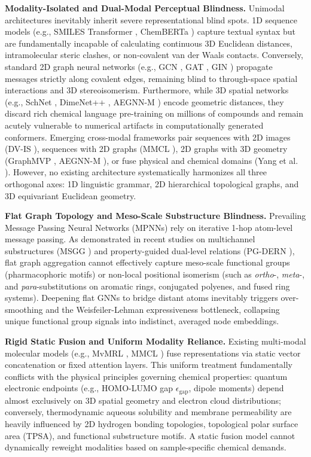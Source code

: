 \documentclass[10pt,twocolumn]{article}
\begin{document}
\noindent\textbf{Modality-Isolated and Dual-Modal Perceptual Blindness.} Unimodal architectures inevitably inherit severe representational blind spots. 1D sequence models (e.g., SMILES Transformer \cite{honda2019smiles}, ChemBERTa \cite{chithrananda2020chemberta}) capture textual syntax but are fundamentally incapable of calculating continuous 3D Euclidean distances, intramolecular steric clashes, or non-covalent van der Waals contacts. Conversely, standard 2D graph neural networks (e.g., GCN \cite{kipf2017semi}, GAT \cite{velickovic2018graph}, GIN \cite{xu2019powerful}) propagate messages strictly along covalent edges, remaining blind to through-space spatial interactions and 3D stereoisomerism. Furthermore, while 3D spatial networks (e.g., SchNet \cite{schutt2018schnet}, DimeNet++ \cite{gasteiger2020directional}, AEGNN-M \cite{cai2025aegnn}) encode geometric distances, they discard rich chemical language pre-training on millions of compounds and remain acutely vulnerable to numerical artifacts in computationally generated conformers. Emerging cross-modal frameworks pair sequences with 2D images (DV-IS \cite{zhang2024dual}), sequences with 2D graphs (MMCL \cite{gao2026mmcl}), 2D graphs with 3D geometry (GraphMVP \cite{liu2022pretraining}, AEGNN-M \cite{cai2025aegnn}), or fuse physical and chemical domains (Yang et al. \cite{yang2021deep}). However, no existing architecture systematically harmonizes all three orthogonal axes: 1D linguistic grammar, 2D hierarchical topological graphs, and 3D equivariant Euclidean geometry.

\noindent\textbf{Flat Graph Topology and Meso-Scale Substructure Blindness.} Prevailing Message Passing Neural Networks (MPNNs) rely on iterative 1-hop atom-level message passing. As demonstrated in recent studies on multichannel substructures (MSGG \cite{wang2020molecular}) and property-guided dual-level relations (PG-DERN \cite{zhang2025property}), flat graph aggregation cannot effectively capture meso-scale functional groups (pharmacophoric motifs) or non-local positional isomerism (such as \textit{ortho}-, \textit{meta}-, and \textit{para}-substitutions on aromatic rings, conjugated polyenes, and fused ring systems). Deepening flat GNNs to bridge distant atoms inevitably triggers over-smoothing and the Weisfeiler-Lehman expressiveness bottleneck, collapsing unique functional group signals into indistinct, averaged node embeddings.

\noindent\textbf{Rigid Static Fusion and Uniform Modality Reliance.} Existing multi-modal molecular models (e.g., MvMRL \cite{zhang2024mvmrl}, MMCL \cite{gao2026mmcl}) fuse representations via static vector concatenation or fixed attention layers. This uniform treatment fundamentally conflicts with the physical principles governing chemical properties: quantum electronic endpoints (e.g., HOMO-LUMO gap $\epsilon_{\text{gap}}$, dipole moments) depend almost exclusively on 3D spatial geometry and electron cloud distributions; conversely, thermodynamic aqueous solubility and membrane permeability are heavily influenced by 2D hydrogen bonding topologies, topological polar surface area (TPSA), and functional substructure motifs. A static fusion model cannot dynamically reweight modalities based on sample-specific chemical demands.
\end{document}
